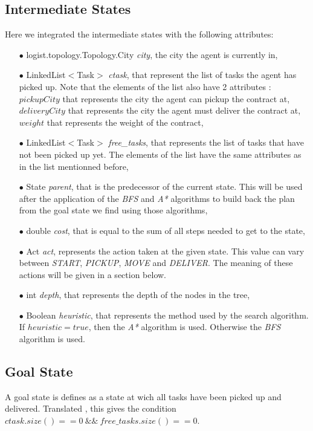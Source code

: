 \documentclass[11pt]{article}
\begin{document}
\subsection{Intermediate States}
Here we integrated the intermediate states with the following attributes:
\begin{itemize}
	\item[$\bullet$] logist.topology.Topology.City \emph{city}, the city the agent is currently in,
	\item[$\bullet$] LinkedList$<$Task$>$ \emph{ctask}, that represent the list of tasks the agent has picked up. Note that the elements of the list also have 2 attributes : $pickupCity$ that represents the city the agent can pickup the contract at, $deliveryCity$ that represents the city the agent must deliver the contract at, $weight$ that represents the weight of the contract,
	\item[$\bullet$] LinkedList$<$Task$>$ \emph{free\_tasks}, that represents the list of tasks that have not been picked up yet. The elements of the list have the same attributes as in the list mentionned before,
	\item[$\bullet$] State \emph{parent}, that is the predecessor of the current state. This will be used after the application of the \emph{BFS} and \emph{A*} algorithms to build back the plan from the goal state we find using those algorithms,
	\item[$\bullet$] double \emph{cost}, that is equal to the sum of all steps needed to get to the state, 
	\item[$\bullet$] Act \emph{act}, represents the action taken at the given state. This value can vary between \emph{START}, \emph{PICKUP}, \emph{MOVE} and \emph{DELIVER}. The meaning of these actions will be given in a section below.
	\item[$\bullet$] int \emph{depth}, that represents the depth of the nodes in the tree,
	\item[$\bullet$] Boolean \emph{heuristic}, that represents the method used by the search algorithm. If $heuristic=true$, then the \emph{A*} algorithm is used. Otherwise the \emph{BFS} algorithm is used.
\end{itemize}

\subsection{Goal State}
A goal state is defines as a state at wich all tasks have been picked up and delivered. Translated , this gives the condition $ctask.size() == 0\ \&\&\ free\_tasks.size() == 0$. 
\end{document}
